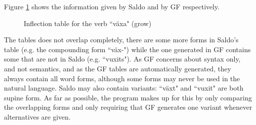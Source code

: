 \documentclass{report}
\begin{document}
Figure \ref{pic:TabVax} shows the information given by Saldo and by GF respectively.\\
\begin{figure}[h]
  \begin{center}
\hspace{5mm}
\caption{Inflection table for the verb ``växa" (grow)}
\label{pic:TabVax}
  \end{center}
\end{figure}
The tables does not overlap completely, there are some more forms in Saldo's table (e.g. the 
compounding form ``väx-")
while the one generated in GF contains some that are not in Saldo (e.g. ``vuxits").
As GF concerns about syntax only, and not semantics, and  as the GF tables are automatically
generated, they always contain all word forms, although some forms may never be
used in the natural language.
Saldo may also contain variants: ``växt" and ``vuxit" are both supine form.
As far as possible, the program makes up for this by only comparing the overlapping forms
and only requiring that GF generates one variant whenever alternatives are given. \\
\end{document}
